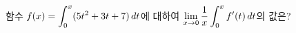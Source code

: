 함수 $f(x)=\displaystyle\int_{0}^{x} (5t^2+3t+7)\mkern3mu dt$에 대하여 $\displaystyle\lim_{x\to 0}\dfrac{1}{x}\int_{0}^{x} f'(t)\mkern3mu dt$의 값은?
